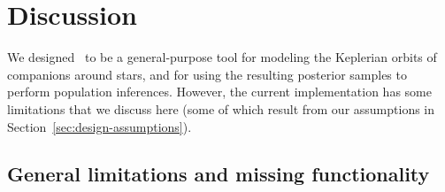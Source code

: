 \documentclass[twocolumn]{AASTeX7/aastex701}
\newcommand{\harv}{\package{harv}}
\begin{document}



\section{Discussion}
\label{sec:discussion}

We designed \harv\ to be a general-purpose tool for modeling the Keplerian orbits of
companions around stars, and for using the resulting posterior samples to perform
population inferences.
However, the current implementation has some limitations that we discuss here (some of
which result from our assumptions in Section~\ref{sec:design-assumptions}).

\subsection{General limitations and missing functionality}
\label{sec:discussion-general}
\end{document}
